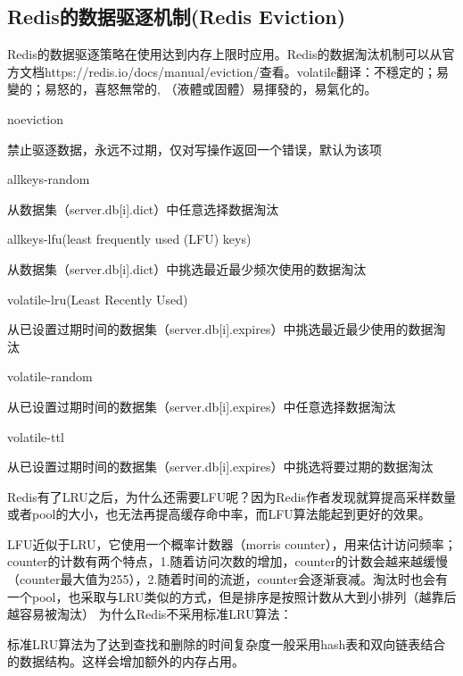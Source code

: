 \documentclass[../../../interview-questions.tex]{subfiles}
\begin{document}
\subsection{Redis的数据驱逐机制(Redis Eviction)}

Redis的数据驱逐策略在使用达到内存上限时应用。Redis的数据淘汰机制可以从官方文档https://redis.io/docs/manual/eviction/查看。volatile翻译：不穩定的；易變的；易怒的，喜怒無常的, （液體或固體）易揮發的，易氣化的。

noeviction

禁止驱逐数据，永远不过期，仅对写操作返回一个错误，默认为该项

allkeys-random

从数据集（server.db[i].dict）中任意选择数据淘汰

allkeys-lfu(least frequently used (LFU) keys)

从数据集（server.db[i].dict）中挑选最近最少频次使用的数据淘汰

volatile-lru(Least Recently Used)

从已设置过期时间的数据集（server.db[i].expires）中挑选最近最少使用的数据淘汰

volatile-random

从已设置过期时间的数据集（server.db[i].expires）中任意选择数据淘汰

volatile-ttl

从已设置过期时间的数据集（server.db[i].expires）中挑选将要过期的数据淘汰


Redis有了LRU之后，为什么还需要LFU呢？因为Redis作者发现就算提高采样数量或者pool的大小，也无法再提高缓存命中率，而LFU算法能起到更好的效果。

LFU近似于LRU，它使用一个概率计数器（morris counter），用来估计访问频率；counter的计数有两个特点，1.随着访问次数的增加，counter的计数会越来越缓慢（counter最大值为255），2.随着时间的流逝，counter会逐渐衰减。淘汰时也会有一个pool，也采取与LRU类似的方式，但是排序是按照计数从大到小排列（越靠后越容易被淘汰）
为什么Redis不采用标准LRU算法：

标准LRU算法为了达到查找和删除的时间复杂度一般采用hash表和双向链表结合的数据结构。这样会增加额外的内存占用。
\end{document}
